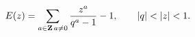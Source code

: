 \begin{equation}
E(z)=\sum_{a\in{\bf Z}\,a\neq 0} \frac{z^a}
{q^a -1}-1, \qquad |q|<|z|<1.
\label{SerE2'}
\end{equation}

